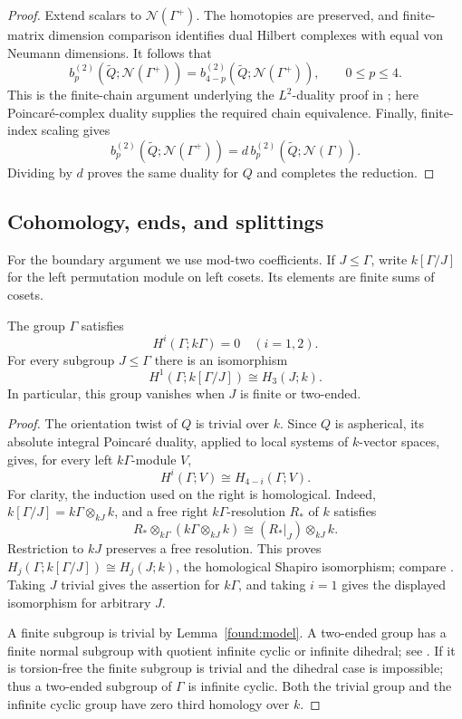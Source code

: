 \begin{proof}
Extend scalars to $\mathcal N(\Gamma^+)$.
The homotopies are preserved, and finite-matrix dimension comparison
identifies dual Hilbert complexes with equal von Neumann dimensions.
It follows that
\[
 b_p^{(2)}(\widetilde Q;\mathcal N(\Gamma^+))
 =b_{4-p}^{(2)}(\widetilde Q;\mathcal N(\Gamma^+)),
 \qquad 0\leq p\leq4.
\]
This is the finite-chain argument underlying the $L^2$-duality proof
in \cite[Theorem~1.35(3) and its proof]{Luck2002}; here
Poincar\'e-complex duality supplies the required chain equivalence.
Finally, finite-index scaling
\cite[Theorem~1.35(9)]{Luck2002} gives
\[
 b_p^{(2)}(\widetilde Q;\mathcal N(\Gamma^+))
 =d\,b_p^{(2)}(\widetilde Q;\mathcal N(\Gamma)).
\]
Dividing by $d$ proves the same duality for $Q$ and completes the
reduction.
\end{proof}

\subsection{Cohomology, ends, and splittings}

For the boundary argument we use mod-two coefficients.
If $J\leq\Gamma$, write $k[\Gamma/J]$ for the left permutation
module on left cosets. Its elements are finite sums of cosets.

\begin{lemma}\label{found:duality}
The group $\Gamma$ satisfies
\[
 H^i(\Gamma;k\Gamma)=0\quad(i=1,2).
\]
For every subgroup $J\leq\Gamma$ there is an isomorphism
\[
 H^1(\Gamma;k[\Gamma/J])\cong H_3(J;k).
\]
In particular, this group vanishes when $J$ is finite or two-ended.
\end{lemma}

\begin{proof}
The orientation twist of $Q$ is trivial over $k$. Since $Q$ is
aspherical, its absolute integral Poincar\'e duality, applied to
local systems of $k$-vector spaces, gives, for
every left $k\Gamma$-module $V$,
\[
 H^i(\Gamma;V)\cong H_{4-i}(\Gamma;V).
\]
For clarity, the induction used on the right is homological.
Indeed, $k[\Gamma/J]=k\Gamma\otimes_{kJ}k$, and a free right
$k\Gamma$-resolution $R_*$ of $k$ satisfies
\[
 R_*\otimes_{k\Gamma}(k\Gamma\otimes_{kJ}k)
 \cong (R_*|_J)\otimes_{kJ}k.
\]
Restriction to $kJ$ preserves a free resolution. This proves
$H_j(\Gamma;k[\Gamma/J])\cong H_j(J;k)$, the homological
Shapiro isomorphism; compare \cite[Chapter~III, Section~6]{Brown1982}.
Taking $J$ trivial gives the assertion for $k\Gamma$, and taking
$i=1$ gives the displayed isomorphism for arbitrary $J$.

A finite subgroup is trivial by Lemma~\ref{found:model}.
A two-ended group has a finite normal subgroup with quotient
infinite cyclic or infinite dihedral; see \cite[Lemma~4.1]{Wall1967}.
If it is torsion-free the
finite subgroup is trivial and the dihedral case is impossible;
thus a two-ended subgroup of $\Gamma$ is infinite cyclic.
Both the trivial group and the infinite cyclic group have zero
third homology over $k$.
\end{proof}

